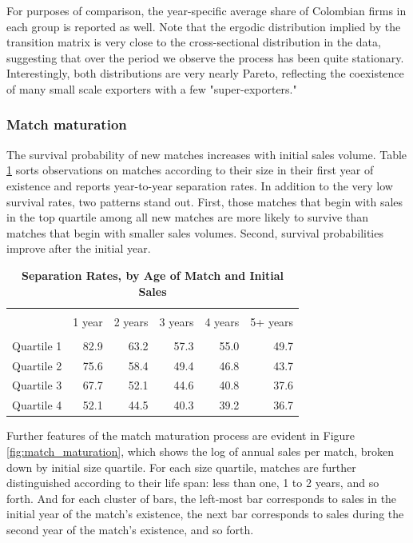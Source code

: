 For purposes of comparison, the year-specific average share of Colombian
firms in each group is reported as well. Note that the ergodic distribution
implied by the transition matrix is very close to the cross-sectional
distribution in the data, suggesting that over the period we observe the
process has been quite stationary. Interestingly, both distributions are
very nearly Pareto, reflecting the coexistence of many small scale exporters
with a few "super-exporters."

\subsubsection{Match maturation}

The survival probability of new matches increases with initial sales volume.
Table \ref{tab:sep_rates} sorts observations on matches according to their
size in their first year of existence and reports year-to-year separation
rates. In addition to the very low survival rates, two patterns stand out.
First, those matches that begin with sales in the top quartile among all new
matches are more likely to survive than matches that begin with smaller
sales volumes. Second, survival probabilities improve after the initial year.

\begin{table}[tbph]
    \centering
    \begin{tabular}{l|rrrrr} \hline \hline \\
                   & 1 year & 2 years & 3 years & 4 years & 5+ years \\ \hline \\
        Quartile 1 & 82.9   & 63.2    & 57.3    & 55.0    & 49.7 \\
        Quartile 2 & 75.6   & 58.4    & 49.4    & 46.8    & 43.7 \\
        Quartile 3 & 67.7   & 52.1    & 44.6    & 40.8    & 37.6 \\
        Quartile 4 & 52.1   & 44.5    & 40.3    & 39.2    & 36.7 \\ \hline
    \end{tabular}
    \caption{\textbf{Separation Rates, by Age of Match and Initial Sales}}
    \label{tab:sep_rates}\centering
\end{table}

Further features of the match maturation process are evident in Figure \ref{fig:match_maturation}, which shows the log of annual sales per match,
broken down by initial size quartile. For each size quartile, matches are
further distinguished according to their life span: less than one, 1 to 2
years, and so forth. And for each cluster of bars, the left-most bar
corresponds to sales in the initial year of the match's existence, the next
bar corresponds to sales during the second year of the match's existence,
and so forth.

